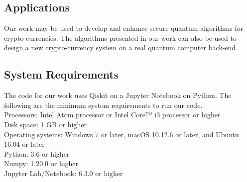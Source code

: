 \subsection{Applications}
Our work may be used to develop and enhance secure quantum algorithms for crypto-currencies. The algorithms presented in our work can also be used to design a new crypto-currency system on a real quantum computer back-end.
\subsection{System Requirements}
The code for our work uses Qiskit on a Jupyter Notebook on Python. The following are the minimum system requirements to run our code.\\
Processors: Intel Atom processor or Intel Core™ i3 processor or higher\\
Disk space: 1 GB or higher\\
Operating systems: Windows 7 or later, macOS 10.12.6 or later, and Ubuntu 16.04 or later\\
Python: 3.6 or higher\\
Numpy: 1.20.0 or higher\\
Jupyter Lab/Notebook: 6.3.0 or higher\\
